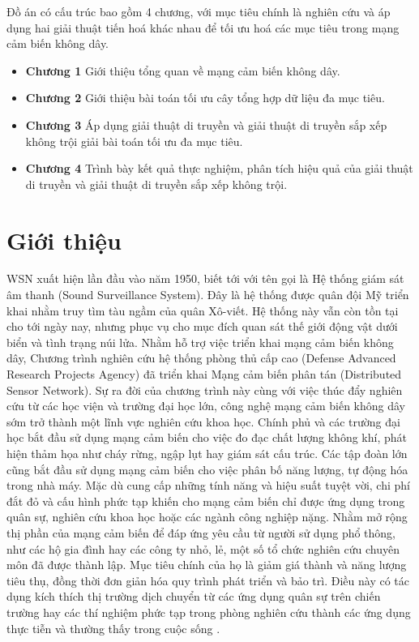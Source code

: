 \documentclass{hust}
\begin{document}
\pagebreak
Đồ án có cấu trúc bao gồm 4 chương, với mục tiêu chính là nghiên cứu và áp dụng hai giải thuật tiến hoá khác nhau để tối ưu hoá các mục tiêu trong mạng cảm biến không dây. 

\begin{itemize}
	\item \textbf{Chương 1} Giới thiệu tổng quan về mạng cảm biến không dây.
	\item \textbf{Chương 2} Giới thiệu bài toán tối ưu cây tổng hợp dữ liệu đa mục tiêu.
	\item \textbf{Chương 3} Áp dụng giải thuật di truyền và giải thuật di truyền sắp xếp không trội giải bài toán tối ưu đa mục tiêu.
	\item \textbf{Chương 4} Trình bày kết quả thực nghiệm, phân tích hiệu quả của giải thuật di truyền và giải thuật di truyền sắp xếp không trội.
\end{itemize}

\pagebreak

\printnoidxglossaries
\pagebreak

\listoftables
\listoffigures

\newpage
\tableofcontents
\newpage

\acresetall

\setcounter{page}{1}
\chapter{Giới thiệu}
\Gls{WSN} xuất hiện lần đầu vào năm 1950, biết tới với tên gọi là Hệ thống giám sát âm thanh (Sound Surveillance System). Đây là hệ thống được quân đội Mỹ triển khai nhằm truy tìm tàu ngầm của quân Xô-viết. Hệ thống này vẫn còn tồn tại cho tới ngày nay, nhưng phục vụ cho mục đích quan sát thế giới động vật dưới biển và tình trạng núi lửa.
Nhằm hỗ trợ việc triển khai mạng cảm biến không dây, Chương trình nghiên cứu hệ thống phòng thủ cấp cao (Defense Advanced Research Projects Agency) đã triển khai Mạng cảm biến phân tán (Distributed Sensor Network). Sự ra đời của chương trình này cùng với việc thúc đẩy nghiên cứu từ các học viện và trường đại học lớn, công nghệ mạng cảm biến không dây sớm trở thành một lĩnh vực nghiên cứu khoa học. Chính phủ và các trường đại học bắt đầu sử dụng mạng cảm biến cho việc đo đạc chất lượng không khí, phát hiện thảm họa như cháy rừng, ngập lụt hay giám sát cấu trúc. Các tập đoàn lớn cũng bắt đầu sử dụng mạng cảm biến cho việc phân bố năng lượng, tự động hóa trong nhà máy.
Mặc dù cung cấp những tính năng và hiệu suất tuyệt vời, chi phí đắt đỏ và cấu hình phức tạp khiến cho mạng cảm biến chỉ được ứng dụng trong quân sự, nghiên cứu khoa học hoặc các ngành công nghiệp nặng. Nhằm mở rộng thị phần của mạng cảm biến để đáp ứng yêu cầu từ người sử dụng phổ thông, như các hộ gia đình hay các công ty nhỏ, lẻ, một số tổ chức nghiên cứu chuyên môn đã được thành lập. Mục tiêu chính của họ là giảm giá thành và năng lượng tiêu thụ, đồng thời đơn giản hóa quy trình phát triển và bảo trì. Điều này có tác dụng kích thích thị trường dịch chuyển từ các ứng dụng quân sự trên chiến trường hay các thí nghiệm phức tạp trong phòng nghiên cứu thành các ứng dụng thực tiễn và thường thấy trong cuộc sống \cite{benefit1evolution}.
\end{document}
